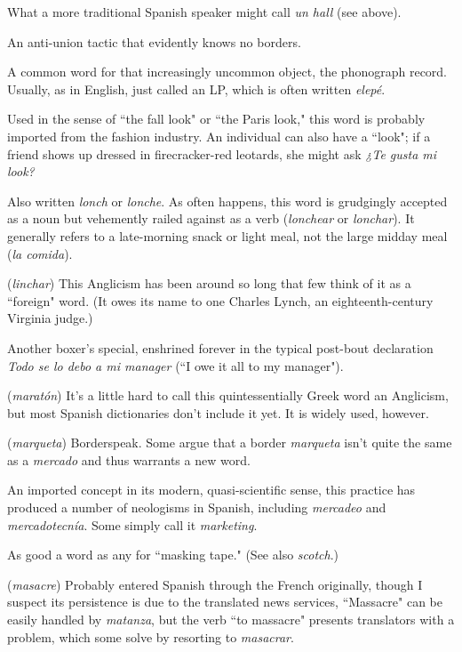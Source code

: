  What a more traditional Spanish speaker might call
\emph{un hall} (see above).

 An anti-union tactic that evidently knows no
borders.

 A common word for that increasingly uncommon object, the phonograph record. Usually, as in English, just called
an LP, which is often written \emph{elepé}.

 Used in the sense of ``the fall look" or ``the Paris
look," this word is probably imported from the fashion industry. An
individual can also have a ``look"; if a friend shows up dressed in
firecracker-red leotards, she might ask \emph{¿Te gusta mi look?}

 Also written \emph{lonch} or \emph{lonche}. As often happens, this
word is grudgingly accepted as a noun but vehemently railed against as
a verb (\emph{lonchear} or \emph{lonchar}). It generally refers to a late-morning snack
or light meal, not the large midday meal (\emph{la comida}).

 (\emph{linchar}) This Anglicism has been around so long that
few think of it as a ``foreign" word. (It owes its name to one Charles
Lynch, an eighteenth-century Virginia judge.)

 Another boxer's special, enshrined forever in the
typical post-bout declaration \emph{Todo se lo debo a mi manager} (``I owe it
all to my manager").

 (\emph{maratón}) It's a little hard to call this quintessentially Greek word an Anglicism, but most Spanish dictionaries
don't include it yet. It is widely used, however.

 (\emph{marqueta}) Borderspeak. Some argue that a border
\emph{marqueta} isn't quite the same as a \emph{mercado} and thus warrants a
new word.

 An imported concept in its modern, quasi-scientific sense, this practice has produced a number of neologisms
in Spanish, including \emph{mercadeo} and \emph{mercadotecnía}. Some simply call
it \emph{marketing}.

 As good a word as any for ``masking tape." (See
also \emph{scotch}.)

 (\emph{masacre}) Probably entered Spanish through the
French originally, though I suspect its persistence is due to the translated news services, ``Massacre" can be easily handled by \emph{matanza}, but
the verb ``to massacre" presents translators with a problem, which
some solve by resorting to \emph{masacrar}.

